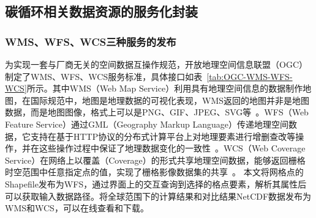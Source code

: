 \subsection{碳循环相关数据资源的服务化封装}
\subsubsection{WMS、WFS、WCS三种服务的发布}
为实现一套与厂商无关的空间数据互操作规范，开放地理空间信息联盟（OGC）制定了WMS、WFS、WCS服务标准，具体接口如表~\ref{tab:OGC-WMS-WFS-WCS}所示。其中WMS（Web Map Service）利用具有地理空间信息的数据制作地图，在国际规范中，地图是地理数据的可视化表现，WMS返回的地图并非是地图数据，而是地图图像，格式上可以是PNG、GIF、JPEG、SVG等~\cite{OGC-WMS}。WFS（Web Feature Service）通过GML（Geography Markup Language）传递地理空间数据，它支持在基于HTTP协议的分布式计算平台上对地理要素进行增删查改等操作，并在这些操作过程中保证了地理数据变化的一致性~\cite{OGC-WFS}。WCS（Web Coverage Service）在网络上以覆盖（Coverage）的形式共享地理空间数据，能够返回栅格时空范围中任意指定点的值，实现了栅格影像数据集的共享~\cite{OGC-WCS}。
本文将网格点的Shapefile发布为WFS，通过界面上的交互查询到选择的格点要素，解析其属性后可以获取输入数据路径。将全球范围下的计算结果和对比结果NetCDF数据发布为WMS和WCS，可以在线查看和下载。

